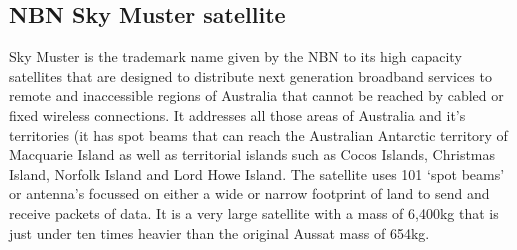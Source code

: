 \subsection{NBN Sky Muster satellite}
Sky Muster is the trademark name given by the NBN to its high capacity satellites that are designed to distribute next generation broadband services to remote and inaccessible regions of Australia that cannot be reached by cabled or fixed wireless connections. It addresses all those areas of Australia and it's territories (it has spot beams that can reach the Australian Antarctic territory of Macquarie Island as well as territorial islands such as Cocos Islands, Christmas Island, Norfolk Island and Lord Howe Island. 
The satellite uses 101 `spot beams' or antenna's focussed on either a wide or narrow footprint of land to send and receive packets of data. It is a very large satellite with a mass of 6,400kg that is just under ten times heavier than the original Aussat mass of 654kg.
